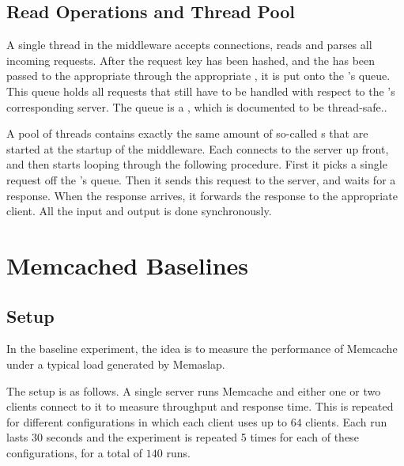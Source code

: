 \documentclass[11pt]{article}
\begin{document}
\subsection{Read Operations and Thread Pool}\label{sec:desc:reads}

%

A single thread in the middleware accepts connections, reads and parses all incoming requests.
After the request key has been hashed, and the  has been passed to the appropriate  through the appropriate , it is put onto the 's queue.
This queue holds all requests that still have to be handled with respect to the 's corresponding server.
The queue is a , which is documented to be thread-safe.\cite{javaBlockingQueueSafe}.

A pool of threads contains exactly the same amount of so-called s that are started at the startup of the middleware.
Each  connects to the server up front, and then starts looping through the following procedure.
First it picks a single request off the 's queue.
Then it sends this request to the server, and waits for a response.
When the response arrives, it forwards the response to the appropriate client.
All the input and output is done synchronously.


\section{Memcached Baselines}\label{sec:baseline}

\subsection{Setup}


In the baseline experiment, the idea is to measure the performance of Memcache under a typical load generated by Memaslap.

The setup is as follows.
A single server runs Memcache and either one or two clients connect to it to measure throughput and response time.
This is repeated for different configurations in which each client uses up to $64$ clients.
Each run lasts 30 seconds and the experiment is repeated 5 times for each of these configurations, for a total of $140$ runs.
\end{document}
